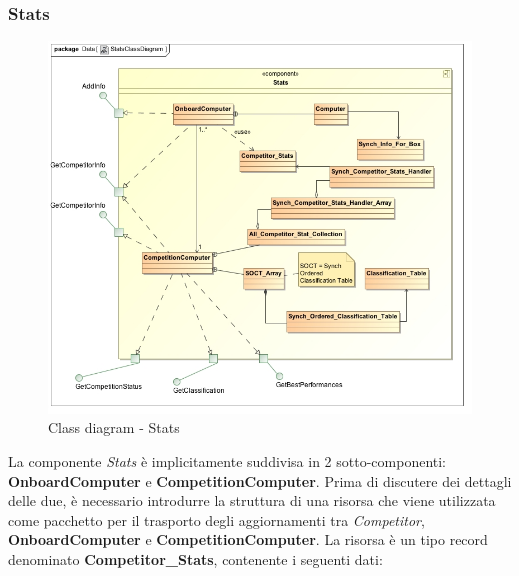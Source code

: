 \subsubsection{Stats}
\begin{center}
\begin{figure}[h!]
	\includegraphics[scale=0.50]{img/ClassDiagrams/StatsClassDiagram.jpg}
\caption{Class diagram - Stats}
\end{figure}
\end{center}
La componente \emph{Stats} \`{e} implicitamente suddivisa in 2 sotto-componenti: \textbf{OnboardComputer} e \textbf{CompetitionComputer}. 
Prima di discutere dei dettagli delle due, \`{e} necessario introdurre la struttura di una risorsa che viene utilizzata come
pacchetto per il trasporto degli aggiornamenti tra \emph{Competitor}, \textbf{OnboardComputer} e \textbf{CompetitionComputer}. La risorsa \`{e} 
un tipo record denominato \textbf{Competitor\_Stats}, contenente i seguenti dati:
